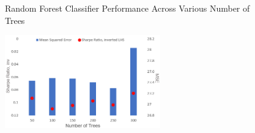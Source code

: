 \documentclass[11pt]{article}
\begin{document}
\begin{figure}[h]
    \centering
	\caption{Random Forest Classifier Performance Across Various Number of Trees}    
	\includegraphics[width=0.6\textwidth]{NtreesMSE}
    \label{fig:NtreesMSE}
     \caption*{}
\end{figure}
\end{document}

